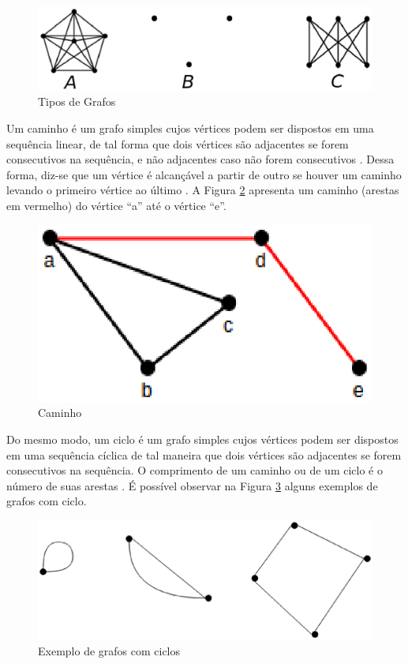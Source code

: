 \begin{figure}[!h]
	\centering
	\includegraphics[scale=0.4]{figuras/capitulo2/tipos_grafos.eps}
	\caption{Tipos de Grafos}
	\label{tipos_grafos}
\end{figure}

Um caminho é um grafo simples cujos vértices podem ser dispostos em uma sequência linear, de tal forma que dois vértices são adjacentes se forem consecutivos na sequência, e não adjacentes caso não forem consecutivos \cite{Bondy:2007}. Dessa forma, diz-se que um vértice é alcançável a partir de outro se houver um caminho levando o primeiro vértice ao último \cite{Costa:2011}. A Figura \ref{caminho} apresenta um caminho (arestas em vermelho) do vértice ``a'' até o vértice ``e''.

\begin{figure}[!h]
	\centering
	\includegraphics[scale=0.5]{figuras/capitulo2/caminho.eps}
	\caption{Caminho}
	\label{caminho}
\end{figure}

Do mesmo modo, um ciclo é um grafo simples cujos vértices podem ser dispostos em uma sequência cíclica de tal maneira que dois vértices são adjacentes se forem consecutivos na sequência. O comprimento de um caminho ou de um ciclo é o número de suas arestas \cite{Costa:2011}. É possível observar na Figura \ref{ciclos} alguns exemplos de grafos com ciclo.

\begin{figure}[!h]
	\centering
	\includegraphics[scale=0.3]{figuras/capitulo2/ciclos.eps}
	\caption{Exemplo de grafos com ciclos}
	\label{ciclos}
\end{figure}

